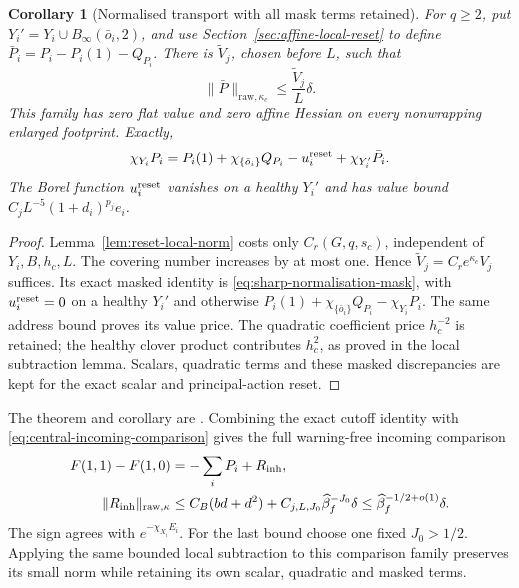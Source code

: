\documentclass[11pt,reqno]{amsart}
\numberwithin{equation}{section}
\newtheorem{corollary}[theorem]{Corollary}
\theoremstyle{definition}
\theoremstyle{remark}
\begin{document}
\begin{corollary}[Normalised transport with all mask terms retained]
\label{cor:sharp-normalised-transport}
For \(q\ge2\), put \(Y_i'=Y_i\cup B_\infty(\bar o_i,2)\), and use
Section~\ref{sec:affine-local-reset} to define
\(\bar P_i=P_i-P_i(1)-Q_{P_i}\). There is
\(\widetilde V_j\), chosen before \(L\), such that
\begin{equation}
             \|\bar P\|_{\mathrm{raw},\kappa_c}
                            \le\frac{\widetilde V_j}{L}\delta.
 \label{eq:sharp-normalised-contraction}
\end{equation}
This family has zero flat value and zero affine Hessian
on every nonwrapping enlarged footprint. Exactly,
\begin{equation}
 \chi_{Y_i}P_i=P_i(1)+\chi_{\{\bar o_i\}}Q_{P_i}
                        -u_i^{\rm reset}+\chi_{Y_i'}\bar P_i.
 \label{eq:sharp-normalisation-mask}
\end{equation}
The Borel function \(u_i^{\rm reset}\) vanishes on a
healthy \(Y_i'\) and has value bound
\(C_jL^{-5}(1+d_i)^{p_j}e_i\).
\end{corollary}
\begin{proof}
Lemma~\ref{lem:reset-local-norm} costs only
\(C_r(G,q,s_c)\), independent of \(Y_i,B,h_c,L\).
The covering number increases by at most one. Hence
\(\widetilde V_j=C_re^{\kappa_c}V_j\) suffices. Its
exact masked identity is
\eqref{eq:sharp-normalisation-mask}, with
\(u_i^{\rm reset}=0\) on a healthy \(Y_i'\) and otherwise
\(P_i(1)+\chi_{\{\bar o_i\}}Q_{P_i}-\chi_{Y_i}P_i\).
The same address bound proves its value price. The
quadratic coefficient price \(h_c^{-2}\) is retained;
the healthy clover product contributes \(h_c^2\), as
proved in the local subtraction lemma. Scalars,
quadratic terms and these masked discrepancies are
kept for the exact scalar and principal-action reset.
\end{proof}

The theorem and corollary are
\cite[Theorem~35.7 and Corollary~35.8, pp.~219--221]{Main}.
Combining the exact cutoff identity with
\eqref{eq:central-incoming-comparison} gives the full
warning-free incoming comparison
\begin{equation}
 \begin{split}
 F(1,1)-F(1,0)&=-\sum_iP_i+R_{\rm inh},\\
 \|R_{\rm inh}\|_{\mathrm{raw},\kappa}
   &\le C_B(bd+d^2)
               +C_{j,L,J_0}\widehat\beta_f^{-J_0}\delta
     \le\widehat\beta_f^{-1/2+o(1)}\delta .
 \end{split}
 \label{eq:sharp-full-incoming-comparison}
\end{equation}
The sign agrees with \(e^{-\chi_{X_i}E_i}\). For the last
bound choose one fixed \(J_0>1/2\). Applying the same
bounded local subtraction to this comparison family
preserves its small norm while retaining its own scalar,
quadratic and masked terms.
\end{document}
